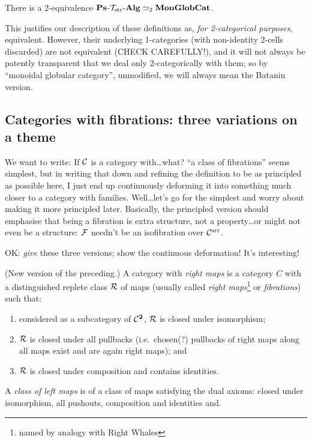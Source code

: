 \documentclass{amsart}
\newcommand{\arr}{\mathrm{arr}}
\begin{document}
\begin{theorem} There is a 2-equivalence $\mathbf{Ps}_{}\mbox{-}{\mathcal{T}_{\mathrm{str}}}\mbox{-}\mathbf{Alg} \simeq_2 \mathbf{MonGlobCat}$.
\end{theorem}

This justifies our description of these definitions as, \emph{for 2-categorical purposes}, equivalent.  However, their underlying 1-categories (with non-identity 2-cells discarded) are not equivalent (CHECK CAREFULLY!), and it will not always be patently transparent that we deal only 2-categorically with them; so by ``monoidal globular category'', unmodified, we will always mean the Batanin version.

\subsection{Categories with fibrations: three variations on a theme}


We want to write: If $\mathcal{C}$ is a category with\ldots what?  ``a class of fibrations'' seems simplest, but in writing that down and refining the definition to be as principled as possible here, I just end up continuously deforming it into something much closer to a category with families.  Well\ldots let's go for the simplest and worry about making it more principled later.  Basically, the principled version should emphasise that being a fibration is extra structure, not a property\ldots or might not even be a structure: $\mathcal{F}$ needn't be an isofibration over $\C^\arr$.

OK: \emph{give} these three versions; show the continuous deformation!  It's interesting!

\begin{definition}(New version of the preceding.)  A category with \emph{right maps} is a category $C$ with a distinguished replete class $\mathcal{R}$ of maps (usually called \emph{right maps}\footnote{named by analogy with Right Whales} or \emph{fibrations}) such that:
\begin{enumerate}
\item considered as a subcategory of $\mathcal{C}^{\mathbf{2}}$, $\mathcal{R}$ is closed under isomorphism;
\item $\mathcal{R}$ is closed under all pullbacks (i.e.\ chosen(?) pullbacks of right maps along all maps exist and are again right maps); and
\item $\mathcal{R}$ is closed under composition and contains identities.
\end{enumerate}

A \emph{class of left maps} is of a class of maps satisfying the dual axioms: closed under isomorphism, all pushouts, composition and identities and. 
\end{definition}
\end{document}
